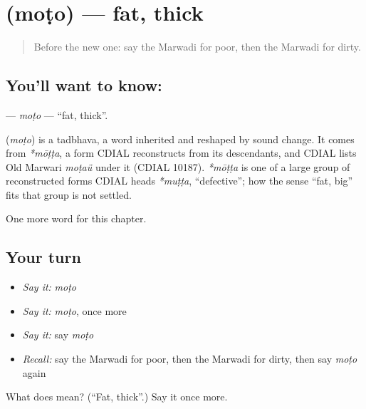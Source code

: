 \section[\texorpdfstring{\mw{मोटो} (moṭo)}{मोटो (moṭo)}]{ (moṭo) — fat, thick}

\label{lesson:MW-C75-moto}



\begin{quote}
Before the new one: say the Marwadi for poor, then the Marwadi for dirty.
\end{quote}

\subsection*{You'll want to know: }
\textbf{} — \emph{moṭo} — \textquotedblleft{}fat, thick\textquotedblright{}.

\begin{cousinweb}
\textbf{} (\emph{moṭo}) is a tadbhava, a word inherited and reshaped by sound change. It comes from \emph{*mōṭṭa}, a form CDIAL reconstructs from its descendants, and CDIAL lists Old Marwari \emph{moṭaü} under it (CDIAL 10187). \emph{*mōṭṭa} is one of a large group of reconstructed forms CDIAL heads \emph{*muṭṭa}, \textquotedblleft{}defective\textquotedblright{}; how the sense \textquotedblleft{}fat, big\textquotedblright{} fits that group is not settled.
\end{cousinweb}

\begin{grammarlens}[title={What you've built}]
One more word for this chapter.
\end{grammarlens}

\subsection*{Your turn}
\begin{itemize}
\raggedright
  \item \emph{Say it:} \emph{moṭo}
  \item \emph{Say it:} \emph{moṭo}, once more
  \item \emph{Say it:} say \emph{moṭo}
  \item \emph{Recall:} say the Marwadi for poor, then the Marwadi for dirty, then say \emph{moṭo} again
\end{itemize}

\begin{tcolorbox}[breakable,colback=teal!4,colframe=teal!35!black,title={Before you move on}]
What does  mean? (\textquotedblleft{}Fat, thick\textquotedblright{}.) Say it once more.
\end{tcolorbox}
